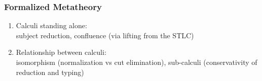 \begin{frame}
	\frametitle{Formalized Metatheory}
	
	\begin{enumerate}
		\item<1-> Calculi standing alone: \\ subject reduction, confluence (via lifting from the STLC)
		
		\item<2-> Relationship between calculi: \\ isomorphism (normalization vs cut elimination), sub-calculi (conservativity of reduction and typing)
	\end{enumerate}
	
\end{frame}

